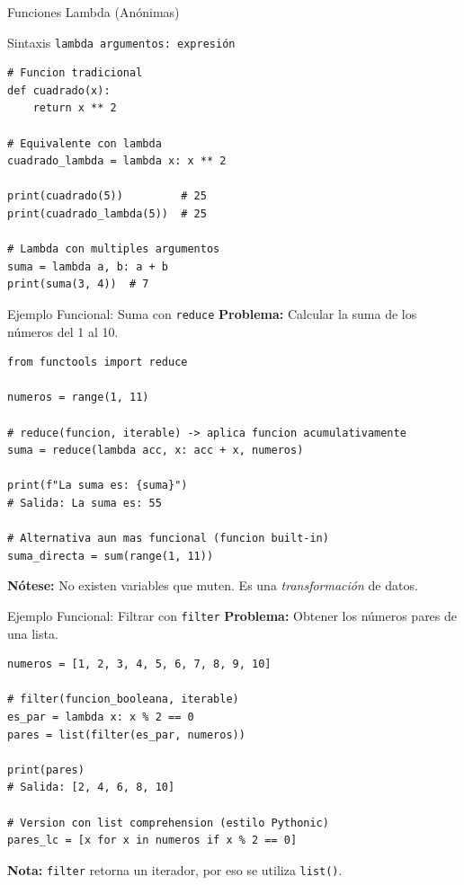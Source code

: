 \documentclass[aspectratio=169]{beamer}
\begin{document}
\begin{frame}[fragile]{Funciones Lambda (Anónimas)}
    \begin{block}{Sintaxis}
        \texttt{lambda argumentos: expresión}
    \end{block}
    \vspace{0.3cm}
    
    \begin{lstlisting}[title=Ejemplos de Lambda]
# Funcion tradicional
def cuadrado(x):
    return x ** 2

# Equivalente con lambda
cuadrado_lambda = lambda x: x ** 2

print(cuadrado(5))         # 25
print(cuadrado_lambda(5))  # 25

# Lambda con multiples argumentos
suma = lambda a, b: a + b
print(suma(3, 4))  # 7
    \end{lstlisting}
\end{frame}

\begin{frame}[fragile]{Ejemplo Funcional: Suma con \texttt{reduce}}
    \textbf{Problema:} Calcular la suma de los números del 1 al 10.
    \vspace{0.3cm}
    
    \begin{lstlisting}[title=Enfoque Funcional]
from functools import reduce

numeros = range(1, 11)

# reduce(funcion, iterable) -> aplica funcion acumulativamente
suma = reduce(lambda acc, x: acc + x, numeros)

print(f"La suma es: {suma}")
# Salida: La suma es: 55

# Alternativa aun mas funcional (funcion built-in)
suma_directa = sum(range(1, 11))
    \end{lstlisting}
    
    \vspace{0.3cm}
    \textbf{Nótese:} No existen variables que muten. Es una \textit{transformación} de datos.
\end{frame}

\begin{frame}[fragile]{Ejemplo Funcional: Filtrar con \texttt{filter}}
    \textbf{Problema:} Obtener los números pares de una lista.
    \vspace{0.3cm}
    
    \begin{lstlisting}[title=Enfoque Funcional]
numeros = [1, 2, 3, 4, 5, 6, 7, 8, 9, 10]

# filter(funcion_booleana, iterable)
es_par = lambda x: x % 2 == 0
pares = list(filter(es_par, numeros))

print(pares)
# Salida: [2, 4, 6, 8, 10]

# Version con list comprehension (estilo Pythonic)
pares_lc = [x for x in numeros if x % 2 == 0]
    \end{lstlisting}
    
    \vspace{0.3cm}
    \textbf{Nota:} \texttt{filter} retorna un iterador, por eso se utiliza \texttt{list()}.
\end{frame}
\end{document}
